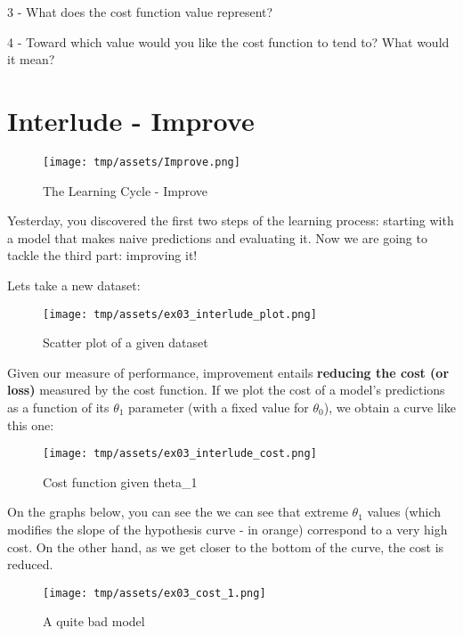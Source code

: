 \documentclass[]{article}
\begin{document}
3 - What does the cost function value represent?

4 - Toward which value would you like the cost function to tend to? What
would it mean?

\clearpage

\hypertarget{interlude---improve-1}{%
\section{Interlude - Improve}\label{interlude---improve-1}}

\begin{figure}
\centering
\texttt{[image: tmp/assets/Improve.png]}
\caption{The Learning Cycle - Improve}
\end{figure}

Yesterday, you discovered the first two steps of the learning process:
starting with a model that makes naive predictions and evaluating it.
Now we are going to tackle the third part: improving it!

Lets take a new dataset:

\begin{figure}
\centering
\texttt{[image: tmp/assets/ex03\_interlude\_plot.png]}
\caption{Scatter plot of a given dataset}
\end{figure}

Given our measure of performance, improvement entails \textbf{reducing
the cost (or loss)} measured by the cost function. If we plot the cost
of a model's predictions as a function of its \(\theta_1\) parameter
(with a fixed value for \(\theta_0\)), we obtain a curve like this one:

\begin{figure}
\centering
\texttt{[image: tmp/assets/ex03\_interlude\_cost.png]}
\caption{Cost function given theta\_1}
\end{figure}

On the graphs below, you can see the we can see that extreme
\(\theta_1\) values (which modifies the slope of the hypothesis curve -
in orange) correspond to a very high cost. On the other hand, as we get
closer to the bottom of the curve, the cost is reduced.

\begin{figure}
\centering
\texttt{[image: tmp/assets/ex03\_cost\_1.png]}
\caption{A quite bad model}
\end{figure}
\end{document}
